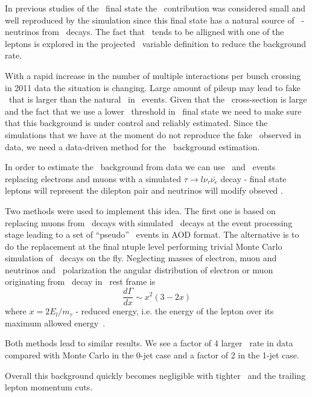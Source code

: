 In previous studies of the \WW\ final state the \dytt\ contribution
was considered small and well reproduced by the simulation since this
final state has a natural source of \met\ - neutrinos from \Tau\
decays. The fact that \met\ tends to be alligned with one of the
leptons is explored in the projected \met\ variable definition to
reduce the background rate.

With a rapid increase in the number of multiple interactions per bunch
crossing in 2011 data the situation is changing. Large amount of
pileup may lead to fake \met\ that is larger than the natural \met\
in \dytt\ events. Given that the \dytt\ cross-section is large and the
fact that we use a lower \met\ threshold in \emu\ final state we need
to make sure that this background is under control and reliably
estimated. Since the simulations that we have at the moment do not
reproduce the fake \met\ observed in data, we need a data-driven
method for the \dytt\ background estimation.

In order to estimate the \dytt\ background from data we can use \zee\
and \zmm\ events replacing electrons and muons with a simulated
$\tau\to l\nu_\tau\bar{\nu_e}$ decay - final state leptons will
represent the dilepton pair and neutrinos will modify obseved \met{}.

Two methods were used to implement this idea. The first one is based
on replacing muons from \zmm\ decays with simulated \Tau\ decays at
the event processing stage leading to a set of ``pseudo'' \ztt\ events
in AOD format. The alternative is to do the replacement at the final
ntuple level performing trivial Monte Carlo simulation of \Tau\ decays
on the fly. Neglecting masses of electron, muon and neutrinos
and \Tau\ polarization the angular distribution of electron or muon
originating from \Tau\ decay in \Tau\ rest frame is
\begin{equation}
        \frac{d\Gamma}{dx}\sim x^2(3-2x)
\end{equation}
where $x=2E_l/m_\tau$ - reduced energy, i.e. the energy of the lepton
over its maximum allowed energy~\cite{pdg}.

Both methods lead to similar results. We see a factor of 4
larger \dytt\ rate in data compared with Monte Carlo in the 0-jet case
and a factor of 2 in the 1-jet case. 

Overall this background quickly becomes negligible with tighter
\mt\ and the trailing lepton momentum cuts.

